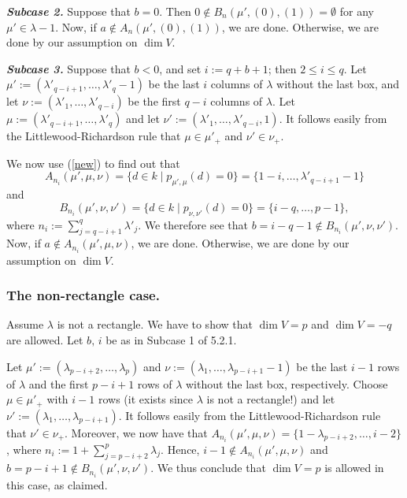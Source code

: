 \documentclass{amsart}
\theoremstyle{definition}
\begin{document}
\textbf{\emph{Subcase 2.}} Suppose that $b=0$. Then $0\notin
B_n(\mu',(0),(1))=\emptyset$ for any $\mu'\in \lambda-1$. Now, if
$a\notin A_n(\mu',(0),(1))$, we are done. Otherwise, we are done by
our assumption on $\dim V$.

\textbf{\emph{Subcase 3.}} Suppose that $b<0$, and set $i:=q+b+1$;
then $2\le i \le q$. Let
$\mu':=(\lambda'_{q-i+1},\dots,\lambda'_q-1)$ be the last $i$
columns of $\lambda$ without the last box,
and let $\nu:=(\lambda'_{1},\dots,\lambda'_{q-i})$ be the first
$q-i$ columns of $\lambda$. Let
$\mu:=(\lambda'_{q-i+1},\dots,\lambda'_q)$ and let
$\nu':=(\lambda'_{1},\dots,\lambda'_{q-i},1)$. It follows easily
from the Littlewood-Richardson rule that $\mu\in\mu'_+$ and
$\nu'\in\nu_+$.

We now use (\ref{new}) to find out that
\begin{equation}\label{a2}
A_{n_i}(\mu',\mu,\nu)= \{d\in k\mid p_{\mu',\mu}(d)=0\}=
\{1-i,\dots,\lambda'_{q-i+1}-1\}
\end{equation}
and
\begin{equation}\label{b2}
B_{n_i}(\mu',\nu,\nu')= \{d\in k\mid p_{\nu,\nu'}(d)=0\}=
\{i-q,\dots,p-1\},
\end{equation}
where $n_i:=\sum_{j=q-i+1}^q \lambda'_j$. We therefore see that
$b=i-q-1\notin B_{n_i}(\mu',\nu,\nu')$. Now, if $a\notin
A_{n_i}(\mu',\mu,\nu)$, we are done. Otherwise, we are done by our
assumption on $\dim V$.

\subsubsection{\textbf{The non-rectangle case.}} Assume $\lambda$ is not a
rectangle. We have to show that $\dim V=p$ and $\dim V=-q$ are
allowed.
Let $b,\,i$ be as in Subcase 1 of 5.2.1.

Let $\mu':=(\lambda_{p-i+2},\dots,\lambda_p)$ and
$\nu:=(\lambda_{1},\dots,\lambda_{p-i+1}-1)$ be the last $i-1$ rows
of $\lambda$ and the first $p-i+1$ rows of $\lambda$ without the
last box, respectively. Choose $\mu\in \mu'_+$ with $i-1$ rows (it
exists since $\lambda$ is not a rectangle!) and let
$\nu':=(\lambda_{1},\dots,\lambda_{p-i+1})$. It follows easily from
the Littlewood-Richardson rule that $\nu'\in\nu_+$. Moreover, we now
have that $A_{n_i}(\mu',\mu,\nu)= \{1-\lambda_{p-i+2},\dots,i-2\}$,
where $n_i:=1+\sum_{j=p-i+2}^p \lambda_j$. Hence, $i-1\notin
A_{n_i}(\mu',\mu,\nu)$ and $b=p-i+1\notin B_{n_i}(\mu',\nu,\nu')$.
We thus conclude that $\dim V=p$ is allowed in this case, as
claimed.
\end{document}
